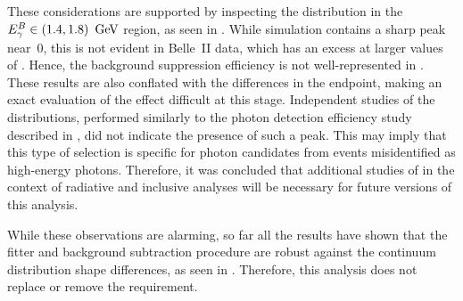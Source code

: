 These considerations are supported by inspecting the \ZMVA distribution in the \mbox{${E^B_{\gamma}}\in(1.4,1.8)~\mathrm{\,Ge\kern -0.1em V}$} region, as seen in .
While simulation contains a sharp peak near~0, this is not evident in Belle~II data, which has an excess at larger values of \ZMVA.
Hence, the background suppression efficiency is not well-represented in \MC.
These results are also conflated with the differences in the \Mbc endpoint, making an exact evaluation of the effect difficult at this stage.
Independent studies of the \ZMVA distributions, performed similarly to the photon detection efficiency study described in , did not indicate the presence of such a peak.
This may imply that this type of selection is specific for photon candidates from \BB events misidentified as high-energy photons.
Therefore, it was concluded that additional studies of \ZMVA in the context of radiative and inclusive analyses will be necessary for future versions of this analysis.

While these observations are alarming, so far all the results have shown that the \Mbc fitter and background subtraction procedure are robust against the
continuum \Mbc distribution shape differences, as seen in .
Therefore, this analysis does not replace or remove the \ZMVA requirement.

